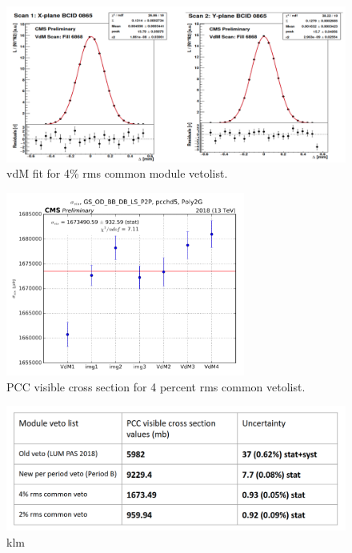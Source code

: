 \begin{figure}[!htp]
\centering
\includegraphics[width=1\textwidth]{ashish_thesis/vdm_fit_4per_rms_veto.png}
\caption{%
   vdM fit for 4\% rms common module vetolist.
}
\label{fig:vdm_fit_4rms}
\end{figure}


\begin{figure}[!htp]
\centering
\includegraphics[width=0.7\textwidth]{ashish_thesis/sigmavis_4per_rms.png}
\caption{%
   PCC visible cross section for 4 percent rms common vetolist.
}
\label{fig:sigmavis_4rms}
\end{figure}


\begin{figure}[!htp]
\centering
\includegraphics[width=1\textwidth]{ashish_thesis/sigmavis_diff_veto.png}
\caption{%
   klm
}
\label{fig:sigmavis_diff_veto}
\end{figure}

